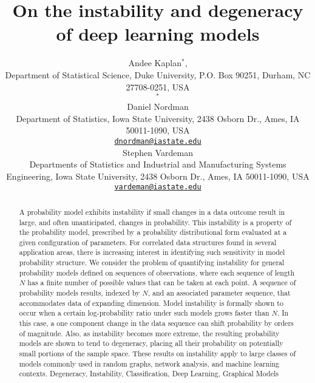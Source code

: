 \documentclass[numbib]{imamat}
\theoremstyle{theorem}
\theoremstyle{lemma}
\theoremstyle{example}
\theoremstyle{corollary}
\theoremstyle{definition}
\theoremstyle{remark}
\theoremstyle{approximation}
\theoremstyle{scheme}
\newcommand{\ak}[1]{{\color{blue} #1}}
\begin{document}
\title{On the instability and degeneracy of deep learning models}

\author{{\sc Andee Kaplan}\(^*\), \\[2pt] Department of Statistical Science, Duke University, P.O. Box 90251, Durham, NC 27708-0251, USA \\ \(^*\){}
\\[6pt] {\sc Daniel Nordman} \\[2pt] Department of Statistics, Iowa State University, 2438 Osborn Dr., Ames, IA 50011-1090, USA \\ {\href{mailto:dnordman@iastate.edu}{\nolinkurl{dnordman@iastate.edu}}}  
\\[6pt] {\sc Stephen Vardeman} \\[2pt] Departments of Statistics and Industrial and Manufacturing Systems Engineering, Iowa State University, 2438 Osborn Dr., Ames, IA 50011-1090, USA \\ {\href{mailto:vardeman@iastate.edu}{\nolinkurl{vardeman@iastate.edu}}}  
}

\maketitle


\begin{abstract}
{A probability model exhibits instability if small changes in a data outcome result in large, and often unanticipated, changes in probability. This instability is a property of the probability \ak{model, prescribed by a probability distributional form evaluated at a given configuration of parameters}. For correlated data structures found in several application areas, there is increasing interest in \ak{identifying} such sensitivity in model probability structure. We consider the problem of quantifying instability for general probability models defined on sequences of observations, where each sequence of length \(N\) has a finite number of possible values \ak{that can be taken at each point}. A sequence of probability models results, indexed by \(N\), \ak{and an associated parameter sequence,} that accommodates data of expanding dimension. Model instability is formally shown to occur when a certain log-probability ratio under such models grows faster than \(N\). In this case, a one component change in the data sequence can shift probability by orders of magnitude. Also, as instability becomes more extreme, the resulting probability models are shown to tend to degeneracy, placing all their probability on potentially small portions of the sample space. These results on instability apply to large classes of models commonly used in random graphs, network analysis, and machine learning contexts.}
{Degeneracy, Instability, Classification, Deep Learning, Graphical Models}
\end{abstract}
\end{document}
